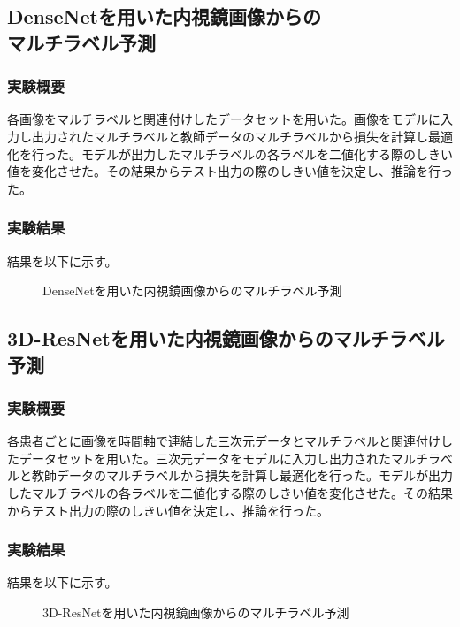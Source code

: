 \subsection{DenseNetを用いた内視鏡画像からの\\マルチラベル予測}
\subsubsection{実験概要}
各画像をマルチラベルと関連付けしたデータセットを用いた。画像をモデルに入力し出力されたマルチラベルと教師データのマルチラベルから損失を計算し最適化を行った。モデルが出力したマルチラベルの各ラベルを二値化する際のしきい値を変化させた。その結果からテスト出力の際のしきい値を決定し、推論を行った。

\subsubsection{実験結果}
結果を以下に示す。
\begin{figure}[tb]
    \centering
    \captionsetup{format=plain,font=large,margin=50pt,name=図}
    \caption[]{DenseNetを用いた内視鏡画像からのマルチラベル予測}
\end{figure}
\subsection{3D-ResNetを用いた内視鏡画像からのマルチラベル予測}
\subsubsection{実験概要}
各患者ごとに画像を時間軸で連結した三次元データとマルチラベルと関連付けしたデータセットを用いた。三次元データをモデルに入力し出力されたマルチラベルと教師データのマルチラベルから損失を計算し最適化を行った。モデルが出力したマルチラベルの各ラベルを二値化する際のしきい値を変化させた。その結果からテスト出力の際のしきい値を決定し、推論を行った。

\subsubsection{実験結果}
結果を以下に示す。
\begin{figure}[tb]
    \centering
    \captionsetup{format=plain,font=large,margin=50pt,name=図}
    \caption[]{3D-ResNetを用いた内視鏡画像からのマルチラベル予測}
\end{figure}
